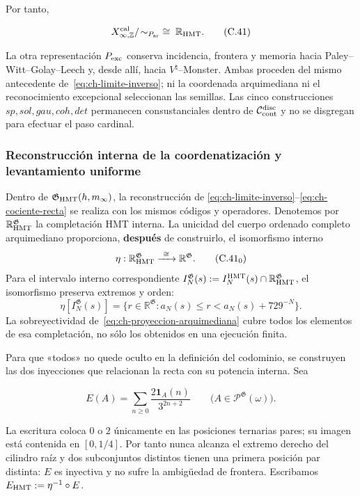 Por tanto,

\[
 X_{\infty,\mathbb Z}^{\rm cal}/\!\sim_{P_{\rm ar}}
 \;\cong\;\mathbb R_{\rm HMT}.
\tag{C.41}\label{eq:ch-cociente-recta}
\]

La otra representación \(P_{\rm exc}\) conserva incidencia, frontera y memoria
hacia Paley--Witt--Golay--Leech y, desde allí, hacia
\(V^\natural\)--Monster. Ambas proceden del
mismo antecedente de~\eqref{eq:ch-limite-inverso}; ni la coordenada arquimediana ni el reconocimiento
excepcional seleccionan las semillas. Las cinco construcciones
\(sp,sol,gau,coh,det\) permanecen consustanciales dentro de
\(\mathcal C_{\rm cont}^{\rm disc}\) y no se disgregan para efectuar el paso
cardinal.



\subsubsection{Reconstrucción interna de la coordenatización y levantamiento uniforme}

Dentro de \(\mathfrak G_{\rm HMT}(h,m_\infty)\), la reconstrucción de
\eqref{eq:ch-limite-inverso}--\eqref{eq:ch-cociente-recta} se realiza con los mismos códigos y operadores. Denotemos por
\(\mathbb R_{\rm HMT}^{\mathfrak G}\) la completación HMT interna. La
unicidad del cuerpo ordenado completo arquimediano proporciona, \textbf{después} de
construirlo, el isomorfismo interno
\[
 \eta:\mathbb R_{\rm HMT}^{\mathfrak G}
 \xrightarrow{\ \cong\ }\mathbb R^{\mathfrak G}.
\tag{C.41$_0$}\label{eq:ch-isomorfismo-interno}
\]
Para el intervalo interno correspondiente
\(I_N^{\mathfrak G}(s):=
 I_N^{\rm HMT}(s)\cap\mathbb R_{\rm HMT}^{\mathfrak G}\), el isomorfismo
preserva extremos y orden:
\[
 \eta[I_N^{\mathfrak G}(s)]
 =\{r\in\mathbb R^{\mathfrak G}:
      a_N(s)\le r<a_N(s)+729^{-N}\}.
\tag{C.41$_0$a}\label{eq:ch-intervalos-internos}
\]
La sobreyectividad de~\eqref{eq:ch-proyeccion-arquimediana} cubre todos los elementos de esa completación, no
sólo los obtenidos en una ejecución finita.

Para que «todos» no quede oculto en la definición del codominio, se construyen
las dos inyecciones que relacionan la recta con su potencia interna. Sea

\[
 E(A)=\sum_{n\ge0}\frac{2\mathbf1_A(n)}{3^{2n+2}}
 \qquad
 \bigl(A\in\mathcal P^{\mathfrak G}(\omega)\bigr).
\tag{C.41a}\label{eq:ch-incrustacion-cantor}
\]

La escritura coloca \(0\) o \(2\) únicamente en las posiciones ternarias
pares; su imagen está contenida en \([0,1/4]\). Por tanto nunca alcanza el
extremo derecho del cilindro raíz y dos subconjuntos distintos tienen una
primera posición par distinta: \(E\) es inyectiva y no sufre la ambigüedad de
frontera. Escribamos \(E_{\rm HMT}:=\eta^{-1}\circ E\).

